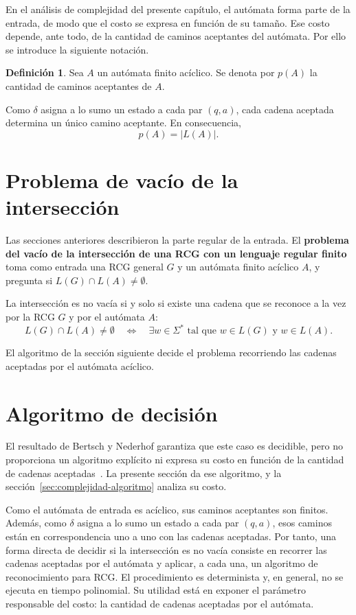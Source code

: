 \documentclass{report}
\theoremstyle{definition}
\newtheorem{definicion}{Definición}[chapter]
\theoremstyle{plain}
\theoremstyle{remark}
\begin{document}
En el análisis de complejidad del presente capítulo, el autómata forma
parte de la entrada, de modo que el costo se expresa en función de su
tamaño. Ese costo depende, ante todo, de la cantidad de caminos
aceptantes del autómata. Por ello se introduce la siguiente notación.

\begin{definicion}
Sea $A$ un autómata finito acíclico. Se denota por $p(A)$ la cantidad
de caminos aceptantes de $A$.
\end{definicion}

Como $\delta$ asigna a lo sumo un estado a cada par $(q,a)$, cada
cadena aceptada determina un único camino aceptante. En consecuencia,
\[
  p(A)=|L(A)|.
\]

\section{Problema de vacío de la intersección}
\label{sec:problema-vacio-interseccion}

Las secciones anteriores describieron la parte regular de la entrada. El
\textbf{problema del vacío de la intersección de una RCG con un lenguaje
regular finito} toma como entrada una RCG general $G$ y un autómata
finito acíclico $A$, y pregunta si $L(G) \cap L(A) \neq \emptyset$.

La intersección es no vacía si y solo si existe una cadena que se
reconoce a la vez por la RCG $G$ y por el autómata $A$:
\[
  L(G) \cap L(A) \neq \emptyset
  \quad \Longleftrightarrow \quad
  \exists w \in \Sigma^* \text{ tal que } w \in L(G) \text{ y } w \in L(A).
\]

El algoritmo de la sección siguiente decide el problema recorriendo las
cadenas aceptadas por el autómata acíclico.

\section{Algoritmo de decisión}
\label{sec:algoritmo-decision}

El resultado de Bertsch y Nederhof garantiza que este caso es decidible,
pero no proporciona un algoritmo explícito ni expresa su costo en función
de la cantidad de cadenas aceptadas~\cite{bertsch2001rcg}. La presente
sección da ese algoritmo, y la sección~\ref{sec:complejidad-algoritmo}
analiza su costo.

Como el autómata de entrada es acíclico, sus caminos aceptantes son
finitos. Además, como $\delta$ asigna a lo sumo un estado a cada par
$(q,a)$, esos caminos están en correspondencia uno a uno con las
cadenas aceptadas. Por tanto, una
forma directa de decidir si la intersección es no vacía consiste en
recorrer las cadenas aceptadas por el autómata y aplicar, a cada una, un
algoritmo de reconocimiento para RCG. El procedimiento es
determinista y, en general, no se ejecuta en tiempo polinomial. Su utilidad está en
exponer el parámetro responsable del costo: la cantidad de cadenas
aceptadas por el autómata.
\end{document}
